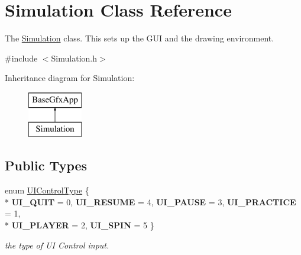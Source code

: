 \hypertarget{classSimulation}{\section{Simulation Class Reference}
\label{classSimulation}
}


The \hyperlink{classSimulation}{Simulation} class. This sets up the G\+U\+I and the drawing environment.  




{\ttfamily \#include $<$Simulation.\+h$>$}

Inheritance diagram for Simulation\+:\begin{figure}[H]
\begin{center}
\leavevmode
\includegraphics[height=2.000000cm]{classSimulation}
\end{center}
\end{figure}
\subsection*{Public Types}
\begin{DoxyCompactItemize}
\item 
\hypertarget{classSimulation_a0fd1c91d4e7699e893929d56b60a60bf}{enum \hyperlink{classSimulation_a0fd1c91d4e7699e893929d56b60a60bf}{U\+I\+Control\+Type} \{ \\*
{\bfseries U\+I\+\_\+\+Q\+U\+I\+T} = 0, 
{\bfseries U\+I\+\_\+\+R\+E\+S\+U\+M\+E} = 4, 
{\bfseries U\+I\+\_\+\+P\+A\+U\+S\+E} = 3, 
{\bfseries U\+I\+\_\+\+P\+R\+A\+C\+T\+I\+C\+E} = 1, 
\\*
{\bfseries U\+I\+\_\+P\+L\+A\+Y\+E\+R} = 2, 
{\bfseries U\+I\+\_\+\+S\+P\+I\+N} = 5
 \}}\label{classSimulation_a0fd1c91d4e7699e893929d56b60a60bf}

\begin{DoxyCompactList}\small\item\em the type of U\+I Control input. \end{DoxyCompactList}\end{DoxyCompactItemize}
